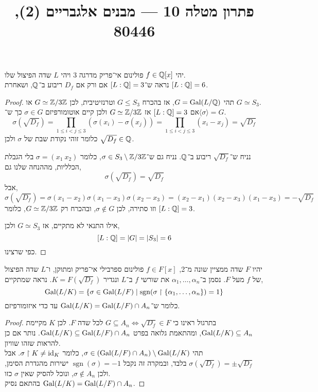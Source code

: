 
\title{פתרון מטלה 10 --- מבנים אלגבריים (2), 80446}


\maketitle
\maketitleprint[red]

\question{}
יהי $f \in \mathbb{Q}[x]$ פולינום אי־פריק מדרגה 3 ויהי $L$ שדה הפיצול שלו. \\
נראה ש־$[L : \mathbb{Q}] = 3$ אם ורק אם $D_f$ ריבוע ב־$\mathbb{Q}$, ושאחרת $[L : \mathbb{Q}] = 6$.
\begin{proof}
	תהי $G = \operatorname{Gal}(L / \mathbb{Q})$, אז בהכרח $G \le S_3$ וטרנזיטיבית, לכן $G \simeq \mathbb{Z} / 3\mathbb{Z}$ או $G \simeq S_3$. \\
	אם $[L : \mathbb{Q}] = 3$ אז $G \simeq \mathbb{Z} / 3\mathbb{Z}$ ולכן קיים אוטומורפיזם $\sigma \in G$ כך ש־$\langle \sigma \rangle = G$.
	\[
		\sigma(\sqrt{D_f})
		= \prod_{1 \le i < j \le 3} (\sigma(x_i) - \sigma(x_j))
		= \prod_{1 \le i < j \le 3} (x_i - x_j)
		= \sqrt{D_f}
	\]
	כלומר זוהי נקודת שבת של $\sigma$ ולכן $\sqrt{D_f} \in \mathbb{Q}$.

	נניח ש־$\sqrt{D_f}$ ריבוע ב־$\mathbb{Q}$.
	נניח גם ש־$\sigma \in S_3 \setminus \mathbb{Z} / 3\mathbb{Z}$, כלומר $\sigma = (x_1\ x_2)$ בלי הגבלת הכלליות,
	מההנחה שלנו גם,
	\[
		\sigma(\sqrt{D_f})
		= \sqrt{D_f}
	\]
	אבל,
	\[
		\sigma(\sqrt{D_f})
		= \sigma(x_1 - x_2) \sigma(x_1 - x_3) \sigma(x_2 - x_3)
		= (x_2 - x_1) (x_2 - x_3) (x_1 - x_3)
		= - \sqrt{D_f}
	\]
	וזו סתירה, לכן $\sigma \notin G$, ובהכרח רק $G \simeq \mathbb{Z} / 3\mathbb{Z}$, כלומר $[L : \mathbb{Q}] = 3$.

	אילו התנאי לא מתקיים, אז $G \simeq S_3$ ולכן,
	\[
		[L : \mathbb{Q}]
		= |G|
		= |S_3|
		= 6
	\]
	כפי שרצינו.
\end{proof}

\question{}
יהיו $F$ שדה ממציין שונה מ־2, $f \in F[x]$ פולינום ספרבילי אי־פריק ומתוקן, ו־$L$ שדה הפיצול של $f$ מעל $F$.
נסמן ב־$\alpha_1, \ldots, \alpha_n$ את שורשי $f$ ב־$L$ ונגדיר $K = F(\sqrt{D_f})$.
נראה שמתקיים,
\[
	\operatorname{Gal}(L / K)
	= \{ \sigma \in \operatorname{Gal}(L / F) \mid \operatorname{sgn}(\sigma \restriction \{\alpha_1, \ldots, \alpha_n\}) = 1 \}
\]
כלומר ש־$\operatorname{Gal}(L / K) = \operatorname{Gal}(L / F) \cap A_n$ עד כדי איזומורפיזם.
\begin{proof}
	בתרגול ראינו כי $G \subseteq A_n \iff \sqrt{D_f} \in F$ לכל שדה $F$.
	לכן $K$ מקיימת $\operatorname{Gal}(L / K) \subseteq A_n$, ומהתאמת גלואה בפרט $\operatorname{Gal}(L / K) \subseteq \operatorname{Gal}(L / F) \cap A_n$.
	נותר אם כן להראות שזהו שוויון. \\
	תהי $\sigma \in (\operatorname{Gal}(L / F) \cap A_n) \setminus \operatorname{Gal}(L / K)$, כלומר $\sigma \restriction K \ne \operatorname{id}_K$.
	אבל $\sigma(\sqrt{D_f}) = \pm \sqrt{D_f}$ בלבד, ובמקרה זה נקבל $\operatorname{sgn}(\sigma) = -1$ ישירות מהגדרת הסימן, ולכן $\sigma \notin A_n$, ונוכל להסיק שאין $\sigma$ כזו. \\
	בהתאם נסיק $\operatorname{Gal}(L / K) = \operatorname{Gal}(L / F) \cap A_n$.
\end{proof}

